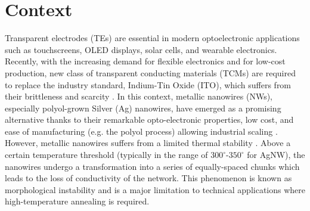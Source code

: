 \section*{Context}
Transparent electrodes (TEs) are essential in modern optoelectronic applications such as touchscreens, OLED displays, solar cells, and wearable electronics. 
Recently, with the increasing demand for flexible electronics and for low-cost production, new class of transparent conducting materials (TCMs) are required to replace the industry standard, Indium-Tin Oxide (ITO), which suffers from their brittleness and scarcity \cite{Bellet2017,MauryaGalvanGautamXu2022, Nguyen2022}. 
In this context, metallic nanowires (NWs), especially polyol-grown Silver (Ag) nanowires, have emerged as a promising alternative thanks to their remarkable opto-electronic properties, low cost, and ease of manufacturing (e.g. the polyol process) allowing industrial scaling \cite{SohnParkOhKangKim2019,Sun2003,Bellet2017,JiuSuganuma2016}. 
However, metallic nanowires suffers from a limited thermal stability \cite{LagrangeLangleyGiustiJimenezBrechetBellet2015}. Above a certain temperature threshold (typically in the range of $300^\circ$-$350^\circ$ for AgNW), the nanowires undergo a transformation into a series of equally-spaced chunks which leads to the loss of conductivity of the network. 
This phenomenon is known as morphological instability and is a major limitation to technical applications where high-temperature annealing is required.
